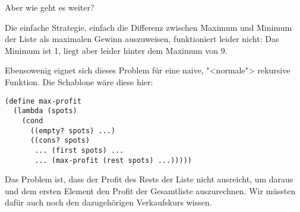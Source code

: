 Aber wie geht es weiter?

Die einfache Strategie, einfach die Differenz zwischen Maximum und
Minimum der Liste als maximalen Gewinn auszuweisen, funktioniert
leider nicht: Das Minimum ist 1, liegt aber leider hinter dem Maximum
von 9.

Ebensowenig eignet sich dieses Problem für eine naive, "<normale">
rekursive Funktion.  Die Schablone wäre diese hier:
%
\begin{lstlisting}
(define max-profit
  (lambda (spots)
    (cond
      ((empty? spots) ...)
      ((cons? spots)
       ... (first spots) ...
       ... (max-profit (rest spots) ...)))))
\end{lstlisting}
%
Das Problem ist, dass der Profit des Rests der Liste nicht ausreicht,
um daraus und dem ersten Element den Profit der Gesamtliste
auszurechnen.  Wir müssten dafür auch noch den dazugehörigen
Verkaufskurs wissen.

